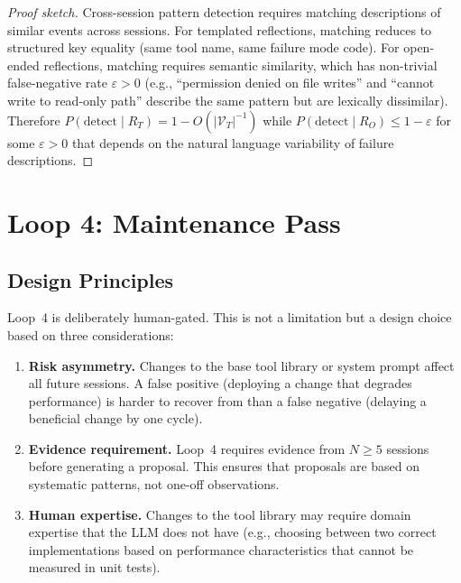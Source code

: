 \documentclass[11pt]{article}
\begin{document}
\begin{proof}[Proof sketch]
Cross-session pattern detection requires matching descriptions of similar events
across sessions. For templated reflections, matching reduces to structured key
equality (same tool name, same failure mode code). For open-ended reflections,
matching requires semantic similarity, which has non-trivial false-negative
rate $\varepsilon > 0$ (e.g., ``permission denied on file writes'' and
``cannot write to read-only path'' describe the same pattern but are
lexically dissimilar). Therefore $P(\text{detect} \mid R_T) = 1 - O(|\mathcal{V}_T|^{-1})$
while $P(\text{detect} \mid R_O) \leq 1 - \varepsilon$ for some $\varepsilon > 0$
that depends on the natural language variability of failure descriptions.
\end{proof}

\section{Loop 4: Maintenance Pass}
\label{sec:loop4}

\subsection{Design Principles}

Loop~4 is deliberately human-gated. This is not a limitation but a design
choice based on three considerations:

\begin{enumerate}[leftmargin=1.5em]
    \item \textbf{Risk asymmetry.} Changes to the base tool library or system
          prompt affect all future sessions. A false positive (deploying a
          change that degrades performance) is harder to recover from than
          a false negative (delaying a beneficial change by one cycle).

    \item \textbf{Evidence requirement.} Loop~4 requires evidence from $N \geq 5$
          sessions before generating a proposal. This ensures that proposals
          are based on systematic patterns, not one-off observations.

    \item \textbf{Human expertise.} Changes to the tool library may require
          domain expertise that the LLM does not have (e.g., choosing between
          two correct implementations based on performance characteristics
          that cannot be measured in unit tests).
\end{enumerate}
\end{document}
